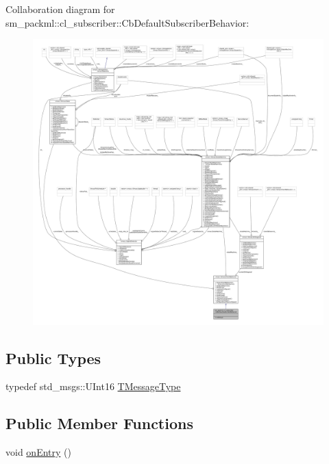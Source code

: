 Collaboration diagram for sm\+\_\+packml\+:\+:cl\+\_\+subscriber\+:\+:Cb\+Default\+Subscriber\+Behavior\+:
\nopagebreak
\begin{figure}[H]
\begin{center}
\leavevmode
\includegraphics[width=350pt]{classsm__packml_1_1cl__subscriber_1_1CbDefaultSubscriberBehavior__coll__graph}
\end{center}
\end{figure}
\subsection*{Public Types}
\begin{DoxyCompactItemize}
\item 
typedef std\+\_\+msgs\+::\+U\+Int16 \hyperlink{classsm__packml_1_1cl__subscriber_1_1CbDefaultSubscriberBehavior_a872930a0cb627bfd0ba2db51d7c5334a}{T\+Message\+Type}
\end{DoxyCompactItemize}
\subsection*{Public Member Functions}
\begin{DoxyCompactItemize}
\item 
void \hyperlink{classsm__packml_1_1cl__subscriber_1_1CbDefaultSubscriberBehavior_abee6ee854163b3724cd9010bc474592e}{on\+Entry} ()
\end{DoxyCompactItemize}


